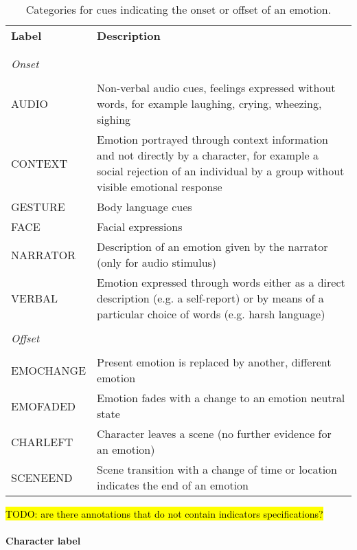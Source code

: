 \begin{table}
  \centering
  \begin{tabular}{lp{10cm}}
    \textbf{Label} & \textbf{Description} \\
    \\\hline\\
    \textit{Onset}\\\\
    AUDIO & Non-verbal audio cues, feelings expressed without words, for example laughing, crying, wheezing, sighing\\
    CONTEXT & Emotion portrayed through context information and not directly by a character, for example a social rejection of an individual by a group without visible emotional response\\
    GESTURE & Body language cues \\
    FACE & Facial expressions \\
    NARRATOR & Description of an emotion given by the narrator (only for audio stimulus)\\
    VERBAL & Emotion expressed through words either as a direct description (e.g. a self-report) or by means of a particular choice of words (e.g. harsh language)\\
    \\
    \textit{Offset}\\\\
    EMOCHANGE & Present emotion is replaced by another, different emotion \\
    EMOFADED & Emotion fades with a change to an emotion neutral state \\
    CHARLEFT & Character leaves a scene (no further evidence for an emotion)\\
    SCENEEND & Scene transition with a change of time or location indicates the end of an emotion\\

  \end{tabular}
  \caption{Categories for cues indicating the onset or offset of an emotion.}
  \label{tab:onoffset_indicators}
\end{table}

\hl{TODO: are there annotations that do not contain indicators specifications?}


\paragraph{Character label}


